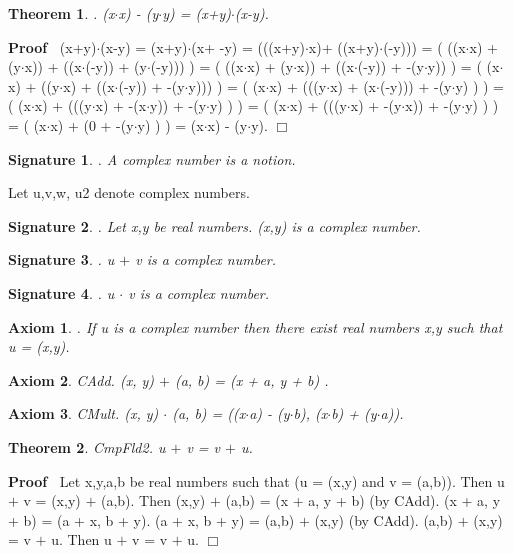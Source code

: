 \documentclass{article}
\newenvironment{forthel}{\begin{leftbar}}{\end{leftbar}}
\newenvironment{proof}{\noindent\textbf{Proof\ }}{\hspace*{\fill}$\Box$\medskip}
\newtheorem{axiom}{Axiom}
\newtheorem{theorem}{Theorem}
\newtheorem{signature}{Signature}
\newcommand{\cmul}{\cdot}
\newcommand{\cadd}{+}
\begin{document}
\begin{forthel}
\begin{theorem}
. (x$\cdot$x) - (y$\cdot$y) = (x+y)$\cdot$(x-y).
\end{theorem}\begin{proof}
 (x+y)$\cdot$(x-y) 	= (x+y)$\cdot$(x+ -y) = (((x+y)$\cdot$x)+ ((x+y)$\cdot$(-y))) = ( ((x$\cdot$x) + (y$\cdot$x)) + ((x$\cdot$(-y)) + (y$\cdot$(-y))) )
= ( ((x$\cdot$x) + (y$\cdot$x)) + ((x$\cdot$(-y)) + -(y$\cdot$y)) )
= ( (x$\cdot$x) + ((y$\cdot$x) + ((x$\cdot$(-y)) + -(y$\cdot$y))) )
= ( (x$\cdot$x) + (((y$\cdot$x) + (x$\cdot$(-y))) + -(y$\cdot$y) ) )
= ( (x$\cdot$x) + (((y$\cdot$x) + -(x$\cdot$y)) + -(y$\cdot$y) ) )
= ( (x$\cdot$x) + (((y$\cdot$x) + -(y$\cdot$x)) + -(y$\cdot$y) ) )
= ( (x$\cdot$x) + (0 + -(y$\cdot$y) ) )
= (x$\cdot$x) - (y$\cdot$y).
\end{proof}








\begin{signature}. A complex number is a notion.

\end{signature}
Let u,v,w, u2 denote complex numbers.
\begin{signature}. Let x,y be real numbers. (x,y) is a complex number.

\end{signature}
\begin{signature}. u $\cadd$ v is a complex number.

\end{signature}
\begin{signature}. u $\cmul$ v is a complex number.

\end{signature}
\begin{axiom}. If u is a complex number then there exist real numbers x,y such that u = (x,y).

\end{axiom}
\begin{axiom} CAdd. (x, y) $\cadd$ (a, b) = (x + a, y + b) .

\end{axiom}
\begin{axiom} CMult. (x, y) $\cmul$ (a, b) = ((x$\cdot$a) - (y$\cdot$b), (x$\cdot$b) + (y$\cdot$a)).

\end{axiom}




\begin{theorem}
 CmpFld2.  u $\cadd$ v = v $\cadd$ u.
\end{theorem}\begin{proof}
 Let x,y,a,b be real numbers such that (u = (x,y) and v = (a,b)).
Then u $\cadd$ v = (x,y) $\cadd$ (a,b).
Then (x,y) $\cadd$ (a,b) = (x + a, y + b) (by CAdd).	
(x + a, y + b) = (a + x, b + y). 
(a + x, b + y) = (a,b) $\cadd$ (x,y) (by CAdd).
(a,b) $\cadd$ (x,y) = v $\cadd$ u. 
Then u $\cadd$ v = v $\cadd$ u.
\end{proof}
 




\end{forthel}
\end{document}
